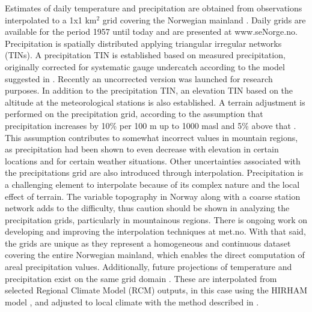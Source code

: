 \documentclass[12pt,a4paper,english]{article}
\begin{document}
Estimates of daily temperature and precipitation are obtained from observations interpolated to a 1x1 km$^2$ grid covering the Norwegian mainland
\citep{Tveitoetal2005, Mohr2009, Janssonetal2007}. Daily grids are available for the period 1957 until today and are presented at
www.seNorge.no. Precipitation is spatially distributed applying triangular irregular networks (TINs). A precipitation TIN is
established based on measured precipitation, originally corrected for systematic gauge undercatch according to the model suggested in \cite{Forlandetal1996}. Recently an uncorrected version was launched for research purposes. In addition to the precipitation TIN, an elevation TIN based on the
altitude at the meteorological stations is also established. A terrain adjustment is performed on the precipitation grid, according to the assumption that precipitation increases by 10\% per 100 m up to 1000 masl and 5\% above that \citep{Forland1979,Forland1984a}. This assumption contributes to somewhat incorrect values in mountain regions, as precipitation had been shown to even decrease with elevation in certain locations and for certain weather situations. Other uncertainties associated with the precipitations grid are also introduced through interpolation. Precipitation is a challenging element to interpolate because of its complex nature and the local effect of terrain. The variable topography in Norway along with a coarse station network adds to the difficulty, thus caution should be shown in analyzing the precipitation grids, particularly in mountainous regions. There is ongoing work on developing and improving the interpolation techniques at met.no. With that said, the grids are unique as they represent a homogeneous and continuous dataset covering the entire Norwegian mainland, which enables the direct computation of areal precipitation values. Additionally, future projections of temperature and precipitation exist on the same grid domain \citep{EngenSkaugenetal2008, EngenSkaugenandForland2011}. These are interpolated from selected Regional Climate Model (RCM) outputs, in this case using the HIRHAM model \citep{HaugenandIversen2008, HaugenandHaakenstad2006}, and adjusted to local climate with the method described in \cite{EngenSkaugen2007}.   
\end{document}
